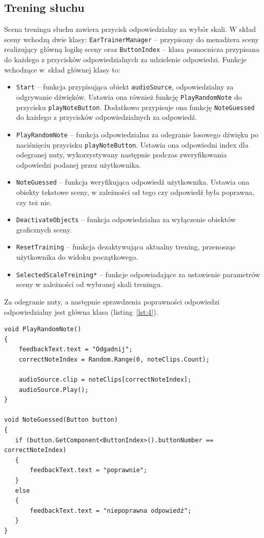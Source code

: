 \subsection{Trening słuchu}

Scena treningu słuchu zawiera przycisk odpowiedzialny za wybór skali. W skład sceny wchodzą dwie klasy: \texttt{EarTrainerManager} -- przypisany do menadżera sceny realizujący główną logikę sceny oraz \texttt{ButtonIndex} -- klasa pomocnicza przypisana do każdego z przycisków odpowiedzialnych za udzielenie odpowiedzi. Funkcje wchodzące w~skład głównej klasy to:
\begin{itemize}
    \item \texttt{Start} -- funkcja przypisująca obiekt \texttt{audioSource}, odpowiedzialny za odgrywanie dźwięków. Ustawia ona również funkcję \texttt{PlayRandomNote} do przycisku \texttt{playNoteButton}. Dodatkowo przypisuje ona funkcję \texttt{NoteGuessed} do każdego z przycisków odpowiedzialnych za odpowiedź.
    \item \texttt{PlayRandomNote} -- funkcja odpowiedzialna za odegranie losowego dźwięku po naciśnięciu przycisku \texttt{playNoteButton}. Ustawia ona odpowiedni index dla odegranej nuty, wykorzystywany następnie podczas zweryfikowania odpowiedzi podanej przez użytkownika.
    \item \texttt{NoteGuessed} -- funkcja weryfikująca odpowiedź użytkownika. Ustawia ona obiekty tekstowe sceny, w zależności od tego czy odpowiedź była poprawna, czy też nie. 
    \item \texttt{DeactivateObjects} -- funkcja odpowiedzialna za wyłączenie obiektów graficznych sceny.
    \item \texttt{ResetTraining} -- funkcja dezaktywująca aktualny trening, przenosząc użytkownika do widoku początkowego.
    \item \texttt{SelectedScaleTreining*} -- funkcje odpowiadające za ustawienie parametrów sceny w zależności od wybranej skali treningu.
\end{itemize}

Za odegranie nuty, a następnie sprawdzenia poprawności odpowiedzi odpowiedzialny jest główna klasa (listing~\ref{lst:4}).

\begin{lstlisting}[style=sharpcstyle,caption=Funkcje \texttt{PlayRandomNote} i \texttt{NoteGuessed}, label=lst:4]
void PlayRandomNote()
{
    feedbackText.text = "Odgadnij"; 
    correctNoteIndex = Random.Range(0, noteClips.Count);
    
    audioSource.clip = noteClips[correctNoteIndex];
    audioSource.Play();
}

void NoteGuessed(Button button)
{
   if (button.GetComponent<ButtonIndex>().buttonNumber == correctNoteIndex)
   {
       feedbackText.text = "poprawnie";
   }
   else
   {
       feedbackText.text = "niepoprawna odpowiedź";
   }
}
\end{lstlisting}

